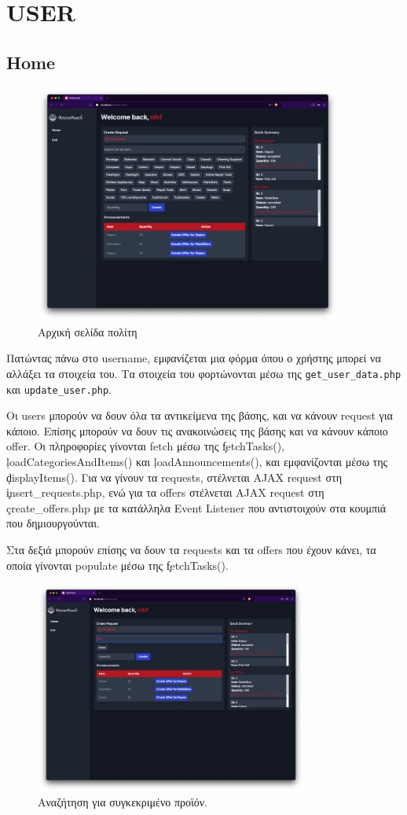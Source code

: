 \section{USER}
    \subsection{Home}
        \begin{figure}[H] \noindent \centering
            \includegraphics[width=0.9\textwidth]{img/user-dashboard}
            \caption{Αρχική σελίδα πολίτη}
        \end{figure}

    Πατώντας πάνω στο username, εμφανίζεται μια φόρμα όπου ο χρήστης μπορεί να αλλάξει τα στοιχεία του.
    Τα στοιχεία του φορτώνονται μέσω της \verb|get_user_data.php| και \verb|update_user.php|.

    Οι users μπορούν να δουν όλα τα αντικείμενα της βάσης, και να κάνουν request για κάποιο.
    Επίσης μπορούν να δουν τις ανακοινώσεις της βάσης και να κάνουν κάποιο offer.
    Οι πληροφορίες γίνονται fetch μέσω της \c{fetchTasks()}, \c{loadCategoriesAndItems()} και \c{loadAnnouncements()},
        και εμφανίζονται μέσω της \c{displayItems()}.
    Για να γίνουν τα requests, στέλνεται AJAX request στη \c{insert\_requests.php}, ενώ για τα offers στέλνεται AJAX request
        στη \c{create\_offers.php} με τα κατάλληλα Event Listener που αντιστοιχούν στα κουμπιά που δημιουργούνται.

    Στα δεξιά μπορούν επίσης να δουν τα requests και τα offers που έχουν κάνει, τα οποία γίνονται populate μέσω της \c{fetchTasks()}.

    \begin{figure}[H] \noindent \centering
        \includegraphics[width=0.8\textwidth]{img/user-dashboard_2}
        \caption{Αναζήτηση για συγκεκριμένο προϊόν.}
    \end{figure}